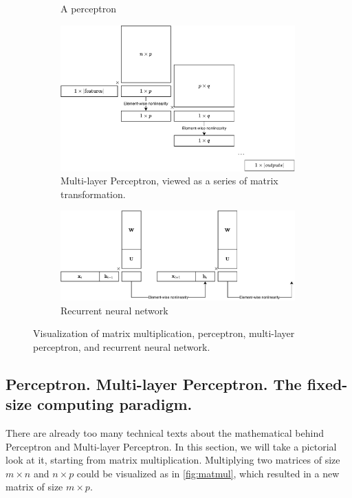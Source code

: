 \begin{figure}[t]
\begin{subfigure}[t]{0.35\textwidth}
    \caption{A perceptron}
    \label{fig:perceptron}
	\end{subfigure}
	\begin{subfigure}[b]{0.7\textwidth}
    \includegraphics[width=0.99\textwidth]{figures/deep_matmul.pdf}
    \caption{Multi-layer Perceptron, viewed as a series of matrix transformation.}
    \label{fig:deep_matmul}
	\end{subfigure}
	\begin{subfigure}[b]{0.7\textwidth}
    \includegraphics[width=0.99\textwidth]{figures/RNN.pdf}
    \caption{Recurrent neural network}
    \label{fig:rnn}
	\end{subfigure}  \caption{Visualization of matrix multiplication, perceptron,
    multi-layer perceptron, and recurrent neural network.}
\end{figure}
\subsection{Perceptron. Multi-layer Perceptron. The fixed-size computing paradigm.}
There are already too many technical texts about the mathematical behind
Perceptron and Multi-layer Perceptron. In this section, we will take a pictorial
look at it, starting from matrix multiplication. Multiplying two matrices of
size $m \times n$ and $n \times p$ could be visualized as in \cref{fig:matmul},
which resulted in a new matrix of size $m \times p$.

